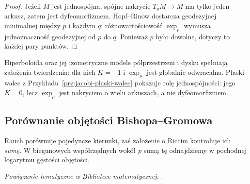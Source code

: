 \begin{proof}
Jeżeli $M$ jest jednospójna, spójne nakrycie
$T_pM\to M$ ma tylko jeden arkusz, zatem
jest dyfeomorfizmem. Hopf--Rinow dostarcza
geodezyjnej minimalnej między $p$ i każdym $q$;
różnowartościowość $\exp_p$ wymusza
jednoznaczność geodezyjnej od $p$ do $q$.
Ponieważ $p$ było dowolne, dotyczy to każdej
pary punktów.
\end{proof}

Hiperboloida oraz jej izometryczne modele
półprzestrzeni i dysku spełniają założenia
twierdzenia: dla nich $K=-1$ i $\exp_p$
jest globalnie odwracalna. Płaski walec
z Przykładu~\ref{prz:jacobi-plaski-walec}
pokazuje rolę jednospójności: jego $K=0$,
lecz $\exp_p$ jest nakryciem o wielu arkuszach,
a nie dyfeomorfizmem.

\subsection*{Porównanie objętości Bishopa--Gromowa}

Rauch porównuje pojedyncze kierunki, zaś
założenie o Riccim kontroluje ich \emph{sumę}.
W biegunowych współrzędnych wokół $p$
sumą tę odnajdziemy w pochodnej logarytmu
gęstości objętości.

\noindent\emph{Powiązanie tematyczne w Bibliotece matematycznej:} .

